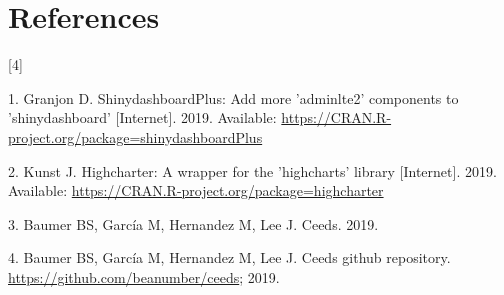\documentclass[10pt,letterpaper]{article}
\begin{document}
\section*{References}\label{references}

{[}4{]}

\hypertarget{refs}{}
\hypertarget{ref-dashboardplus}{}
1. Granjon D. ShinydashboardPlus: Add more 'adminlte2' components to
'shinydashboard' {[}Internet{]}. 2019. Available:
\url{https://CRAN.R-project.org/package=shinydashboardPlus}

\hypertarget{ref-highcharter}{}
2. Kunst J. Highcharter: A wrapper for the 'highcharts' library
{[}Internet{]}. 2019. Available:
\url{https://CRAN.R-project.org/package=highcharter}

\hypertarget{ref-ceeds}{}
3. Baumer BS, García M, Hernandez M, Lee J. Ceeds. 2019.

\hypertarget{ref-ceeds_repo}{}
4. Baumer BS, García M, Hernandez M, Lee J. Ceeds github repository.
\url{https://github.com/beanumber/ceeds}; 2019.

\nolinenumbers
\end{document}

